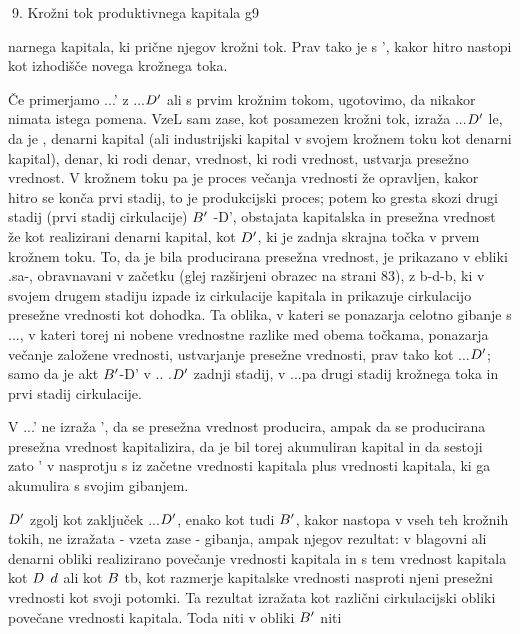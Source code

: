 \documentclass[kapital_02.tex]{subfiles}
\begin{document}
 9. Krožni tok produktivnega kapitala g9



 narnega kapitala, ki prične njegov krožni tok. Prav tako je s \KPEP', kakor hitro nastopi kot izhodišče novega krožnega toka.

Če primerjamo \KPEP...\KPEP' z \KPED...\( D' \) ali s prvim krožnim tokom, ugotovimo, da nikakor nimata istega pomena. VzeL sam zase, kot posamezen krožni tok, izraža \KPED...\( D' \) le, da je \KPED, denarni kapital (ali industrijski kapital v svojem krožnem toku kot denarni kapital), denar, ki rodi denar, vrednost, ki rodi vrednost, ustvarja presežno vrednost. V krožnem toku \KPEP pa je proces večanja vrednosti že opravljen, kakor hitro se konča prvi stadij, to je produkcijski proces; potem ko gresta skozi drugi stadij (prvi stadij cirkulacije) \( B' \) -D', obstajata kapitalska in presežna vrednost že kot realizirani denarni kapital, kot \( D' \), ki je zadnja skrajna točka v prvem krožnem toku. To, da je bila producirana presežna vrednost, je prikazano v ebliki \KPEP.sa-\KPEP, obravnavani v začetku (glej razširjeni obrazec na strani 83), z b-d-b, ki v svojem drugem stadiju izpade iz cirkulacije kapitala in prikazuje cirkulacijo presežne vrednosti kot dohodka. Ta oblika, v kateri se ponazarja celotno gibanje s \KPEP...\KPEP, v kateri torej ni nobene vrednostne razlike med obema točkama, ponazarja večanje založene vrednosti, ustvarjanje presežne vrednosti, prav tako kot \KPED...\( D' \); samo da je akt \( B' \)-D' v \KPED.. .\( D' \) zadnji stadij, v \KPEP...\KPEP pa drugi stadij krožnega toka in prvi stadij cirkulacije.

V \KPEP...\KPEP' ne izraža \KPEP', da se presežna vrednost producira, ampak da se producirana presežna vrednost kapitalizira, da je bil torej akumuliran kapital in da sestoji zato \KPEP' v nasprotju s \KPEP iz začetne vrednosti kapitala plus vrednosti kapitala, ki ga akumulira s svojim gibanjem.

\( D' \) zgolj kot zaključek \KPED...\( D' \), enako kot tudi \( B' \), kakor nastopa v vseh teh krožnih tokih, ne izražata - vzeta zase - gibanja, ampak njegov rezultat: v blagovni ali denarni obliki realizirano povečanje vrednosti kapitala in s tem vrednost kapitala kot \( D \) \( d \) ali kot \( B \) tb, kot razmerje kapitalske vrednosti nasproti njeni presežni vrednosti kot svoji potomki. Ta rezultat izražata kot različni cirkulacijski obliki povečane vrednosti kapitala. Toda niti v obliki \( B' \) niti
\end{document}
